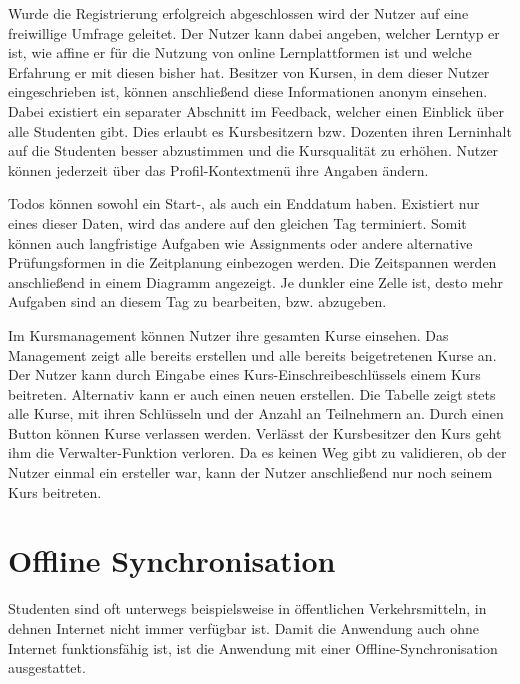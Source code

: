 


Wurde die Registrierung erfolgreich abgeschlossen wird der Nutzer auf eine freiwillige Umfrage geleitet.
Der Nutzer kann dabei angeben, welcher Lerntyp er ist, wie affine er für die Nutzung von online Lernplattformen ist und welche Erfahrung er mit diesen bisher hat.
Besitzer von Kursen, in dem dieser Nutzer eingeschrieben ist, können anschließend diese Informationen anonym einsehen.
Dabei existiert ein separater Abschnitt im Feedback, welcher einen Einblick über alle Studenten gibt.
Dies erlaubt es Kursbesitzern bzw. Dozenten ihren Lerninhalt auf die Studenten besser abzustimmen und die Kursqualität zu erhöhen.
Nutzer können jederzeit über das Profil-Kontextmenü ihre Angaben ändern.


Todos können sowohl ein Start-, als auch ein Enddatum haben.
Existiert nur eines dieser Daten, wird das andere auf den gleichen Tag terminiert.
Somit können auch langfristige Aufgaben wie Assignments oder andere alternative Prüfungsformen in die Zeitplanung einbezogen werden.
Die Zeitspannen werden anschließend in einem Diagramm angezeigt.
Je dunkler eine Zelle ist, desto mehr Aufgaben sind an diesem Tag zu bearbeiten, bzw. abzugeben.



Im Kursmanagement können Nutzer ihre gesamten Kurse einsehen.
Das Management zeigt alle bereits erstellen und alle bereits beigetretenen Kurse an.
Der Nutzer kann durch Eingabe eines Kurs-Einschreibeschlüssels einem Kurs beitreten.
Alternativ kann er auch einen neuen erstellen.
Die Tabelle zeigt stets alle Kurse, mit ihren Schlüsseln und der Anzahl an Teilnehmern an.
Durch einen Button können Kurse verlassen werden.
Verlässt der Kursbesitzer den Kurs geht ihm die Verwalter-Funktion verloren.
Da es keinen Weg gibt zu validieren, ob der Nutzer einmal ein ersteller war, kann der Nutzer anschließend nur noch seinem Kurs beitreten.




\section{Offline Synchronisation}
Studenten sind oft unterwegs beispielsweise in öffentlichen Verkehrsmitteln, in dehnen Internet nicht immer verfügbar ist.
Damit die Anwendung auch ohne Internet funktionsfähig ist, ist die Anwendung mit einer Offline-Synchronisation ausgestattet.

